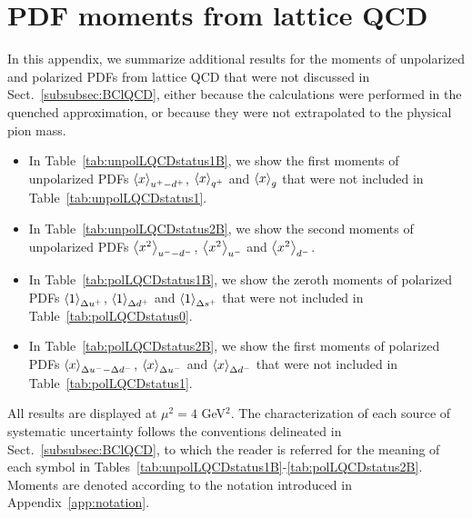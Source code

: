 \section{PDF moments from lattice QCD}
\label{sec:LQCDtables}

In this appendix, we summarize additional results for the moments of 
unpolarized and polarized PDFs from lattice QCD that were not discussed in 
Sect.~\ref{subsubsec:BClQCD}, either because the calculations were 
performed in the quenched approximation, or because they were not extrapolated
to the physical pion mass.

\begin{itemize}

\item In Table~\ref{tab:unpolLQCDstatus1B}, we show the first moments of 
unpolarized PDFs $\left\langle x\right\rangle_{u^+-d^+}$, $\left\langle x\right\rangle_{q^+}$ and $\left\langle x\right\rangle_g$
that were not included in Table~\ref{tab:unpolLQCDstatus1}.

\item In Table~\ref{tab:unpolLQCDstatus2B}, we show the second moments of 
unpolarized PDFs $\left\langle x^2\right\rangle_{u^--d^-}$, $\left\langle x^2\right\rangle_{u^-}$ and $\left\langle x^2\right\rangle_{d^-}$.

\item In Table~\ref{tab:polLQCDstatus1B}, we show the zeroth moments of 
polarized PDFs $\left\langle 1\right\rangle_{\Delta u^+}$, $\left\langle 1\right\rangle_{\Delta d^+}$ and 
$\left\langle 1\right\rangle_{\Delta s^+}$ that were not included in Table~\ref{tab:polLQCDstatus0}.

\item In Table~\ref{tab:polLQCDstatus2B}, we show the first moments of 
polarized PDFs $\left\langle x\right\rangle_{\Delta u^--\Delta d^-}$, $\left\langle x\right\rangle_{\Delta u^-}$ and  
$\left\langle x\right\rangle_{\Delta d^-}$ that were not included in Table~\ref{tab:polLQCDstatus1}.

\end{itemize}
%
All results are displayed at $\mu^2=4$ GeV$^2$.
%
The characterization of each source of systematic uncertainty follows the
conventions delineated in Sect.~\ref{subsubsec:BClQCD}, to which the reader 
is referred for the meaning of each symbol in 
Tables~\ref{tab:unpolLQCDstatus1B}-\ref{tab:polLQCDstatus2B}.
%
Moments are denoted according to the notation introduced in 
Appendix~\ref{app:notation}.

